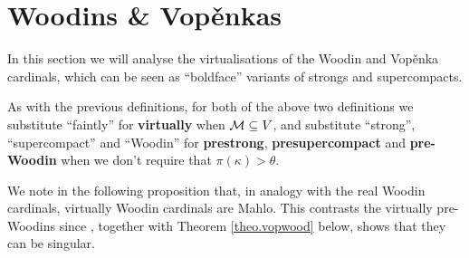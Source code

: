\documentclass[../../main]{subfiles}
\begin{document}
\section{Woodins \& Vop\v enkas}

In this section we will analyse the virtualisations of the Woodin and Vop\v enka cardinals, which can be seen as ``boldface'' variants of strongs and supercompacts.



As with the previous definitions, for both of the above two definitions we substitute ``faintly'' for \textbf{virtually} when $\operatorname{\mathcal M}\subseteq V$, and substitute ``strong'', ``supercompact'' and ``Woodin'' for \textbf{prestrong}, \textbf{presupercompact} and \textbf{pre-Woodin} when we don't require that $\pi(\kappa)>\theta$.

\qquad We note in the following proposition that, in analogy with the real Woodin cardinals, virtually Woodin cardinals are Mahlo. This contrasts the virtually pre-Woodins since \cite{WilsonVopenka}, together with Theorem \ref{theo.vopwood} below, shows that they can be singular.
\end{document}
